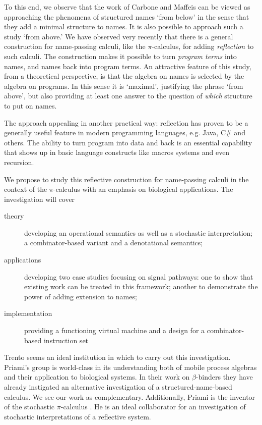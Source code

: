 \documentclass[]{amsart}
\theoremstyle{definition}
\theoremstyle{remark}
\numberwithin{equation}{subsection}
\newcommand{\pic}{$\pi$-calculus}
\begin{document}
To this end, we observe that the work of Carbone and Maffeis can be
viewed as approaching the phenomena of structured names `from below'
in the sense that they add a minimal structure to names. It is also
possible to approach such a study `from above.' We have observed very
recently that there is a general construction for name-passing
calculi, like the {\pic}, for adding \emph{reflection} to such
calculi. The construction makes it possible to turn \emph{program
terms} into names, and names back into program terms. An attractive
feature of this study, from a theoretical perspective, is that the
algebra on names is selected by the algebra on programs. In this sense
it is `maximal', justifying the phrase `from above', but also
providing at least one answer to the question of \emph{which}
structure to put on names.

The approach appealing in another practical way: reflection has proven
to be a generally useful feature in modern programming languages,
e.g. Java, C{\#} \cite{JavaReflection} and others. The ability to turn
program into data and back is an essential capability that shows up in
basic language constructs like macros systems and even recursion.

We propose to study this reflective construction for name-passing
calculi in the context of the {\pic} with an emphasis on biological
applications. The investigation will cover 

\begin{description}

	\item [theory] developing an operational semantics as well
	as a stochastic interpretation; a combinator-based variant
	and a denotational semantics;

	\item [applications] developing two case studies focusing on
	signal pathways: one to show that existing work can be treated
	in this framework; another to demonstrate the power of adding
	extension to names;

	\item [implementation] providing a functioning virtual machine
	and a design for a combinator-based instruction set

\end{description}

Trento seems an ideal institution in which to carry out this
investigation. Priami's group is world-class in its understanding both
of mobile process algebras and their application to biological
systems. In their work on {$\beta$-binders} they have already instigated
an alternative investigation of a structured-name-based calculus. We
see our work as complementary. Additionally, Priami is the inventor of
the stochastic {\pic} \cite{priamistochasticpi}. He is an ideal collaborator for an
investigation of stochastic interpretations of a reflective system.
\end{document}
